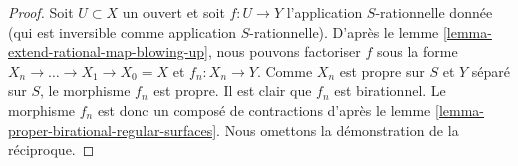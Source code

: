 \begin{proof} Soit $U \subset X$ un ouvert et soit $f : U \to Y$ l'application $S$-rationnelle donnée (qui est inversible comme application $S$-rationnelle). D'après le lemme \ref{lemma-extend-rational-map-blowing-up}, nous pouvons factoriser $f$ sous la forme $X_n \to \ldots \to X_1 \to X_0 = X$ et $f_n : X_n \to Y$. Comme $X_n$ est propre sur $S$ et $Y$ séparé sur $S$, le morphisme $f_n$ est propre. Il est clair que $f_n$ est birationnel. Le morphisme $f_n$ est donc un composé de contractions d'après le lemme \ref{lemma-proper-birational-regular-surfaces}. Nous omettons la démonstration de la réciproque. \end{proof}












